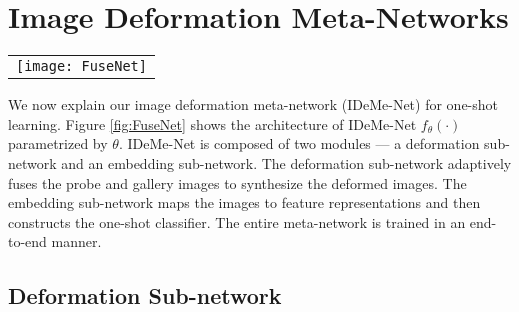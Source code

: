 \documentclass[10pt,letterpaper,twocolumn]{article}
\providecommand{\tabularnewline}{\\}
\begin{document}
\section{Image Deformation Meta-Networks}

\begin{figure*}


\begin{centering}
\begin{tabular}{c}
\texttt{[image: FuseNet]}\tabularnewline
\end{tabular}
\par\end{centering}
\caption{\label{fig:FuseNet}The overall architecture of our image deformation
meta-network (IDeMe-Net). }



\end{figure*}

We now explain our image deformation meta-network (IDeMe-Net) for
one-shot learning. Figure \ref{fig:FuseNet} shows the architecture
of IDeMe-Net $f_{\theta}(\cdot)$ parametrized by $\theta$. IDeMe-Net
is composed of two modules --- a deformation sub-network and an embedding
sub-network. The deformation sub-network adaptively fuses the probe
and gallery images to synthesize the deformed images. The embedding
sub-network maps the images to feature representations and then constructs
the one-shot classifier. The entire meta-network is trained in an
end-to-end manner.

\subsection{Deformation Sub-network}
\end{document}
